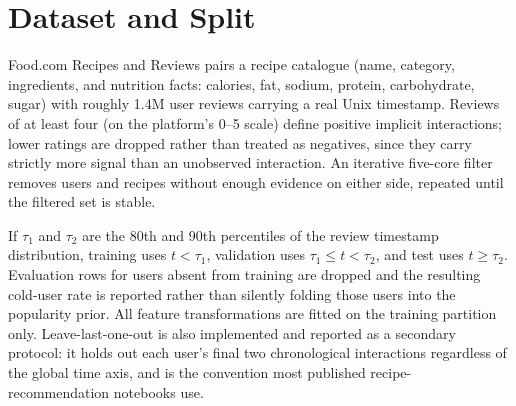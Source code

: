 \section{Dataset and Split}
Food.com Recipes and Reviews pairs a recipe catalogue (name, category,
ingredients, and nutrition facts: calories, fat, sodium, protein,
carbohydrate, sugar) with roughly 1.4M user reviews carrying a real Unix
timestamp. Reviews of at least four (on the platform's 0--5 scale) define
positive implicit interactions; lower ratings are dropped rather than
treated as negatives, since they carry strictly more signal than an
unobserved interaction. An iterative five-core filter removes users and
recipes without enough evidence on either side, repeated until the filtered
set is stable.

If $\tau_1$ and $\tau_2$ are the 80th and 90th percentiles of the review
timestamp distribution, training uses $t < \tau_1$, validation uses
$\tau_1 \le t < \tau_2$, and test uses $t \ge \tau_2$. Evaluation rows for
users absent from training are dropped and the resulting cold-user rate is
reported rather than silently folding those users into the popularity
prior. All feature transformations are fitted on the training partition
only. Leave-last-one-out is also implemented and reported as a secondary
protocol: it holds out each user's final two chronological interactions
regardless of the global time axis, and is the convention most published
recipe-recommendation notebooks use.
